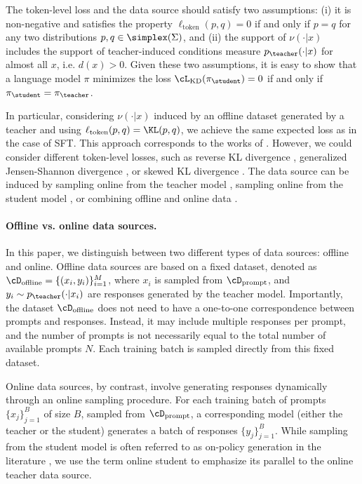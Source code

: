 The token-level loss and the data source should satisfy two assumptions: (i) it is non-negative and satisfies the property $\ell_{\mathrm{token}}(p,q) = 0$ if and only if $p = q$ for any two distributions $p,q \in \simplex(\Sigma)$, and (ii) the support of $\nu(\cdot | x)$ includes the support of teacher-induced conditions measure $p_{\teacher}(\cdot | x)$ for almost all $x$, i.e. $d(x) > 0$.  Given these two assumptions, it is easy to show that a language model $\pi$ minimizes the loss $\cL_{\mathrm{KD}}(\pi_{\student}) = 0$ if and only if $\pi_{\student} = \pi_{\teacher}$. 

In particular, considering $\nu(\cdot|x)$ induced by an offline dataset generated by a teacher and using $\ell_{\mathrm{token}}(p,q) = \KL(p,q)$, we achieve the same expected loss as in the case of SFT. This approach corresponds to the works of \cite{hinton2015distilling, sanh2019distilbert}. However, we could consider different token-level losses, such as reverse KL divergence \cite{gu2024minillm}, generalized Jensen-Shannon divergence \cite{agarwal2024onpolicy}, or skewed KL divergence \cite{ko2024distillm}. The data source can be induced by sampling online from the teacher model \cite{kim2016sequence}, sampling online from the student model \cite{gu2024minillm}, or combining offline and online data \cite{lin2020autoregressive, agarwal2024onpolicy, ko2024distillm}. 


\paragraph{Offline vs. online data sources.}

In this paper, we distinguish between two different types of data sources: offline and online.
Offline data sources are based on a fixed dataset, denoted as $\cD_{\mathrm{offline}} = \{(x_i, y_i)\}_{i=1}^M$, where $x_i$ is sampled from $\cD_{\mathrm{prompt}}$, and $y_i \sim p_{\teacher}(\cdot | x_i)$ are responses generated by the teacher model. Importantly, the dataset $\cD_{\mathrm{offline}}$ does not need to have a one-to-one correspondence between prompts and responses. Instead, it may include multiple responses per prompt, and the number of prompts is not necessarily equal to the total number of available prompts $N$. Each training batch is sampled directly from this fixed dataset.

Online data sources, by contrast, involve generating responses dynamically through an online sampling procedure. For each training batch of prompts $\{x_j\}_{j=1}^B$ of size $B$, sampled from $\cD_{\mathrm{prompt}}$, a corresponding model (either the teacher or the student) generates a batch of responses $\{y_j\}_{j=1}^B$. While sampling from the student model is often referred to as on-policy generation in the literature \cite{agarwal2024onpolicy}, we use the term online student to emphasize its parallel to the online teacher data source. 


